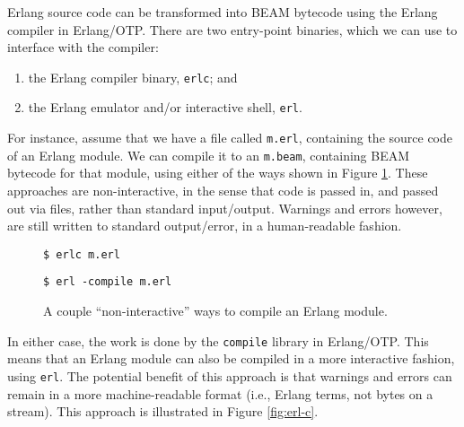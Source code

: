 Erlang source code can be transformed into BEAM bytecode using the
Erlang compiler in Erlang/OTP. There are two entry-point binaries,
which we can use to interface with the compiler:

\begin{enumerate}

\item the Erlang compiler binary, \texttt{erlc}; and

\item the Erlang emulator and/or interactive shell, \texttt{erl}.

\end{enumerate}

For instance, assume that we have a file called \texttt{m.erl},
containing the source code of an Erlang module. We can compile it to
an \texttt{m.beam}, containing BEAM bytecode for that module, using
either of the ways shown in Figure \ref{fig:erlc}. These approaches
are non-interactive, in the sense that code is passed in, and passed
out via files, rather than standard input/output. Warnings and errors
however, are still written to standard output/error, in a
human-readable fashion.

\begin{figure}[ht!]
\begin{minipage}[t]{0.5\textwidth}
\begin{lstlisting}
$ erlc m.erl
\end{lstlisting}
\end{minipage}%
\begin{minipage}[t]{0.5\textwidth}
\begin{lstlisting}
$ erl -compile m.erl
\end{lstlisting}
\end{minipage}%
\caption{A couple ``non-interactive'' ways to compile an Erlang
module.}
\label{fig:erlc}
\end{figure}

In either case, the work is done by the \texttt{compile} library in
Erlang/OTP. This means that an Erlang module can also be compiled in a
more interactive fashion, using \texttt{erl}. The potential benefit of
this approach is that warnings and errors can remain in a more
machine-readable format (i.e., Erlang terms, not bytes on a stream).
This approach is illustrated in Figure \ref{fig:erl-c}.

